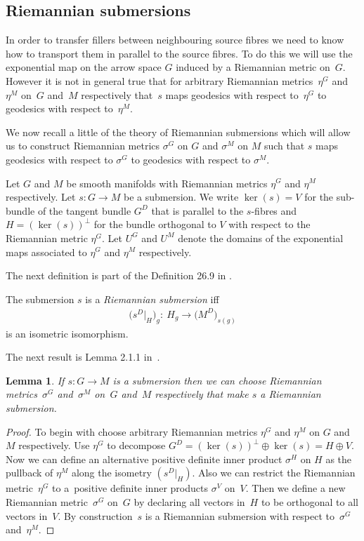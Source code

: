 \documentclass[pdftex]{sigma}
\numberwithin{equation}{section}
\newtheorem{Lemma}[Theorem]{Lemma}
\begin{document}
\subsection{Riemannian submersions}

In order to transfer f\/illers between neighbouring source f\/ibres we need to know how to transport them in parallel to the source f\/ibres. To do this we will use the exponential map on the arrow space $G$ induced by a Riemannian metric on~$G$. However it is not in general true that for arbitrary Riemannian metrics~$\eta^G$ and~$\eta^M$ on~$G$ and~$M$ respectively that~$s$ maps geodesics with respect to~$\eta^G$ to geodesics with respect to~$\eta^M$.

We now recall a little of the theory of Riemannian submersions which will allow us to construct Riemannian metrics $\sigma^G$ on $G$ and $\sigma^M$ on $M$ such that $s$ maps geodesics with respect to $\sigma^G$ to geodesics with respect to $\sigma^M$.

\begin{Notation} Let $G$ and $M$ be smooth manifolds with Riemannian metrics $\eta^G$ and $\eta^M$ respectively. Let $s\colon G\rightarrow M$ be a submersion. We write $\ker(s)=V$ for the sub-bundle of the tangent bundle $G^D$ that is parallel to the $s$-f\/ibres and $H=(\ker(s))^{\perp}$ for the bundle orthogonal to $V$ with respect to the Riemannian metric $\eta^G$. Let $U^G$ and $U^M$ denote the domains of the exponential maps associated to $\eta^G$ and $\eta^M$ respectively.
\end{Notation}

The next def\/inition is part of the Def\/inition 26.9 in \cite{Michor2008}.

\begin{Definition} The submersion $s$ is a \emph{Riemannian submersion} if\/f
\begin{gather*}\big(s^D|_H\big)_g\colon \ H_g \rightarrow \big(M^D\big)_{s(g)}\end{gather*}
is an isometric isomorphism.
\end{Definition}

The next result is Lemma 2.1.1 in~\cite{delHoyo2015}.

\begin{Lemma} If $s\colon G \rightarrow M$ is a submersion then we can choose Riemannian metrics~$\sigma^G$ and~$\sigma^M$ on~$G$ and~$M$ respectively that make $s$ a Riemannian submersion.
\end{Lemma}
\begin{proof} To begin with choose arbitrary Riemannian metrics $\eta^G$ and $\eta^M$ on $G$ and $M$ respectively. Use $\eta^G$ to decompose $G^D = (\ker(s))^{\perp}\oplus \ker(s)=H\oplus V$. Now we can def\/ine an alternative positive def\/inite inner product $\sigma^H$ on $H$ as the pullback of $\eta^M$ along the isometry $(s^D|_H)$. Also we can restrict the Riemannian metric~$\eta^G$ to a~positive def\/inite inner products $\sigma^V$ on~$V$. Then we def\/ine a new Riemannian metric~$\sigma^G$ on~$G$ by declaring all vectors in~$H$ to be orthogonal to all vectors in~$V$. By construction~$s$ is a Riemannian submersion with respect to~$\sigma^G$ and~$\eta^M$.
\end{proof}
\end{document}

